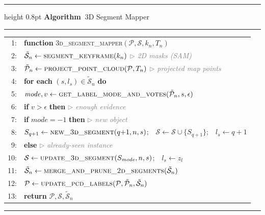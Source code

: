 \begin{otherlanguage}{english}
\begin{algorithm}[h!]
  \label{alg:segment_mapper}%
  \hrule height 0.8pt\vspace{3pt}
  \noindent\textbf{Algorithm~\thealgorithm}\quad 3D Segment Mapper\par
  \vspace{2pt}\hrule\vspace{3pt}
  \newcommand{\fn}[1]{\textsc{#1}}
  \newcommand{\I}[1]{\hspace*{#1.4em}}
  \newcommand{\cm}[1]{\quad\textcolor{gray}{$\triangleright$ \textit{#1}}}
  {\small
  \begin{tabular}{@{}r@{\;\;}l@{}}
     1: & \textbf{function} \fn{3d\_segment\_mapper}$(\mathcal{P}, \mathcal{S}, k_n, T_n)$ \\
     2: & \I1$\tilde{\mathcal{S}}_n \gets \fn{segment\_keyframe}(k_n)$ \cm{2D masks (SAM)} \\
     3: & \I1$\tilde{\mathcal{P}}_n \gets \fn{project\_point\_cloud}(\mathcal{P}, T_n)$ \cm{projected map points} \\
     4: & \I1\textbf{for each} $(s, l_s) \in \tilde{\mathcal{S}}_n$ \textbf{do} \\
     5: & \I2$\mathit{mode}, v \gets \fn{get\_label\_mode\_and\_votes}(\tilde{\mathcal{P}}_n, s, \epsilon)$ \\
     6: & \I2\textbf{if} $v > \epsilon$ \textbf{then} \cm{enough evidence} \\
     7: & \I3\textbf{if} $\mathit{mode} = -1$ \textbf{then} \cm{new object} \\
     8: & \I4$S_{q+1} \gets \fn{new\_3d\_segment}(q{+}1, n, s)$;\ \ $\mathcal{S} \gets \mathcal{S} \cup \{S_{q+1}\}$;\ \ $l_s \gets q{+}1$ \\
     9: & \I3\textbf{else} \cm{already-seen instance} \\
    10: & \I4$\mathcal{S} \gets \fn{update\_3d\_segment}(S_{\mathit{mode}}, n, s)$;\ \ $l_s \gets z_l$ \\
    11: & \I1$\tilde{\mathcal{S}}_n \gets \fn{merge\_and\_prune\_2d\_segments}(\tilde{\mathcal{S}}_n)$ \\
    12: & \I1$\mathcal{P} \gets \fn{update\_pcd\_labels}(\mathcal{P}, \tilde{\mathcal{P}}_n, \tilde{\mathcal{S}}_n)$ \\
    13: & \I1\textbf{return} $\mathcal{P}, \mathcal{S}, \tilde{\mathcal{S}}_n$ \\
  \end{tabular}}
  \vspace{-2pt}\hrule
\end{algorithm}


\end{otherlanguage}
